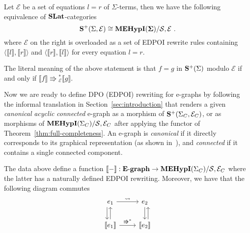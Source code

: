 
\begin{theorem}
\label{thm:full-completeness}
Let $\mathcal{E}$ be a set of equations $l = r$ of $\Sigma$-terms, then we have the following equivalence of $\mathbf{SLat}$-categories
\vspace{-2mm}
\[
	\catname{S}^{+}(\Sigma, \mathcal {E} ) \cong \WellTypedMdaEcospans / \mathcal{S,E}~.
\vspace{-1mm}
\]
where $\mathcal{E}$ on the right is overloaded as a set of EDPOI rewrite rules containing $\langle \llbracket l \rrbracket, \llbracket r \rrbracket  \rangle$ and $\langle \llbracket r \rrbracket, \llbracket l \rrbracket  \rangle$ for every equation $l = r$.
\end{theorem}

The literal meaning of the above statement is that $f = g$ in $\mathbf{S}^{+}(\Sigma)$ modulo $\mathcal{E}$ if and only if $\llbracket f \rrbracket \Rrightarrow{}^{*}_{\mathcal{E}} \llbracket g \rrbracket$.

Now we are ready to define DPO (EDPOI) rewriting for e-graphs by following the informal translation in Section~\ref{sec:introduction} that renders a given \textit{canonical} \textit{acyclic} \textit{connected} e-graph as a morphism of $\mathbf{S}^{+}(\Sigma_{C}, \mathcal{E}_{C})$, or as morphisms of $\mathbf{MEHypI}(\Sigma_{C}) / \mathcal{S}, \mathcal{E}_{C}$  after applying the functor of Theorem~\ref{thm:full-completeness}.
An e-graph is \emph{canonical} if it directly corresponds to its graphical representation (as shown in~), and \emph{connected} if it contains a single connected component.
\begin{proposition}
The data above define a function $\llbracket - \rrbracket : \mathbf{E}\text{-}\mathbf{graph} \to \mathbf{MEHypI}(\Sigma_{C}) / \mathcal{S}, \mathcal{E}_{C}$ where the latter has a naturally defined EDPOI rewriting.
Moreover, we have that the following diagram commutes
\[
\begin{tikzcd}
		e_1 \arrow[r, "\leadsto"] \arrow[d, shift right=2]                & e_2 \arrow[d]                                        \\
		\llbracket e_1 \rrbracket \arrow[r, "\Rrightarrow^{*}"] \arrow[u] & \llbracket e_{2} \rrbracket \arrow[u, shift right=2]
\end{tikzcd}
\]
\end{proposition}

